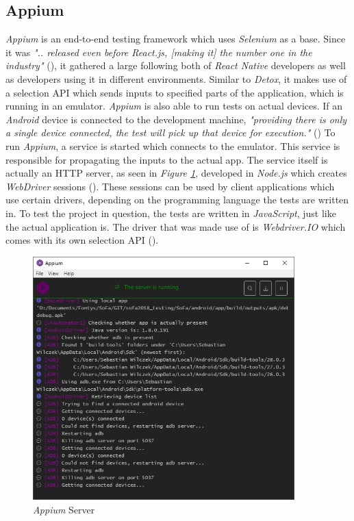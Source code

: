 \subsection{Appium}
\label{ssec:appium}

\textit{Appium} is an end-to-end testing framework which uses \textit{Selenium} as a base. Since it was \textit{".. released even before React.js, [making it] the number one in the industry"} (\cite{detox-vs-appium}), it gathered a large following both of \textit{React Native} developers as well as developers using it in different environments. Similar to \textit{Detox}, it makes use of a selection API which sends inputs to specified parts of the application, which is running in an emulator. \textit{Appium} is also able to run tests on actual devices. If an \textit{Android} device is connected to the development machine, \textit{"providing there is only a single device connected, the test will pick up that device for execution."} (\cite[p. 169]{test-automation-appium})
\newline
To run \textit{Appium}, a service is started which connects to the emulator. This service is responsible for propagating the inputs to the actual app. The service itself is actually an HTTP server, as seen in \textit{Figure \ref{fig:appium_server}}, developed in \textit{Node.js} which creates \textit{WebDriver} sessions (\cite{appium-and-selenium}). These sessions can be used by client applications which use certain drivers, depending on the programming language the tests are written in. To test the project in question, the tests are written in \textit{JavaScript}, just like the actual application is. The driver that was made use of is \textit{Webdriver.IO} which comes with its own selection API (\cite{webdriverio}).

\begin{figure}[H]
    \begin{center}
        \includegraphics[width=0.9\textwidth]{images/appium_server.png}
        \caption{\textit{Appium} Server}
        \label{fig:appium_server}
    \end{center}
\end{figure}


